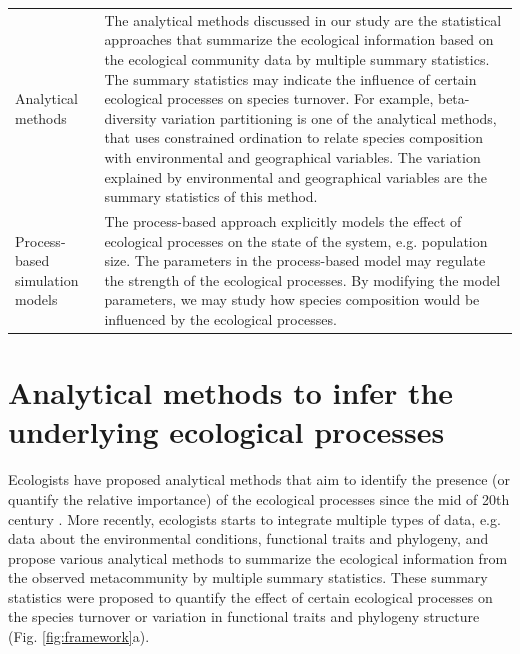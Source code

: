 {\begin{footnotesize}
\begin{longtable}{p{}p{}}
				Analytical methods & The analytical methods discussed in our study are the statistical approaches that summarize the ecological information based on the ecological community data by multiple summary statistics. The summary statistics may indicate the influence of certain ecological processes on species turnover. For example, beta-diversity variation partitioning is one of the analytical methods, that uses constrained ordination to relate species composition with environmental and geographical variables. The variation explained by environmental and geographical variables are the summary statistics of this method.\\
				Process-based simulation models & The process-based approach explicitly models the effect of ecological processes on the state of the system, e.g. population size. The parameters in the process-based model may regulate the strength of the ecological processes. By modifying the model parameters, we may study how species composition would be influenced by the ecological processes.\\
				\bottomrule
			\end{longtable}
		\end{footnotesize}
	}
	
	\section{Analytical methods to infer the underlying ecological processes}
	\noindent
	Ecologists have proposed analytical methods that aim to identify the presence (or quantify the relative importance) of the ecological processes since the mid of 20th century \citep{macarthur1958population, diamond1975island}. More recently, ecologists starts to integrate multiple types of data, e.g. data about the environmental conditions, functional traits and phylogeny, and propose various analytical methods to summarize the ecological information from the observed metacommunity by multiple summary statistics. These summary statistics were proposed to quantify the effect of certain ecological processes on the species turnover or variation in functional traits and phylogeny structure (Fig. \ref{fig:framework}a). 
	
